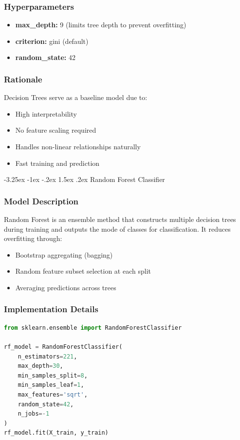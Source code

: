 \documentclass[12pt,a4paper]{article}
\makeatletter
\renewcommand{\subsection}{\@startsection{subsection}{2}{\z@}%
                                   {-3.25ex \@plus -1ex \@minus -.2ex}%
                                   {1.5ex \@plus .2ex}%
                                   {\normalfont\large\bfseries\vspace{0.3\baselineskip}}}
\makeatother
\begin{document}
\subsubsection{Hyperparameters}
\begin{itemize}
    \item \textbf{max\_depth:} 9 (limits tree depth to prevent overfitting)
    \item \textbf{criterion:} gini (default)
    \item \textbf{random\_state:} 42
\end{itemize}

\subsubsection{Rationale}
Decision Trees serve as a baseline model due to:
\begin{itemize}
    \item High interpretability
    \item No feature scaling required
    \item Handles non-linear relationships naturally
    \item Fast training and prediction
\end{itemize}

\subsection{Random Forest Classifier}

\subsubsection{Model Description}
Random Forest is an ensemble method that constructs multiple decision trees during training and outputs the mode of classes for classification. It reduces overfitting through:
\begin{itemize}
    \item Bootstrap aggregating (bagging)
    \item Random feature subset selection at each split
    \item Averaging predictions across trees
\end{itemize}

\subsubsection{Implementation Details}
\begin{lstlisting}[language=Python]
from sklearn.ensemble import RandomForestClassifier

rf_model = RandomForestClassifier(
    n_estimators=221,
    max_depth=30,
    min_samples_split=8,
    min_samples_leaf=1,
    max_features='sqrt',
    random_state=42,
    n_jobs=-1
)
rf_model.fit(X_train, y_train)
\end{lstlisting}
\end{document}
